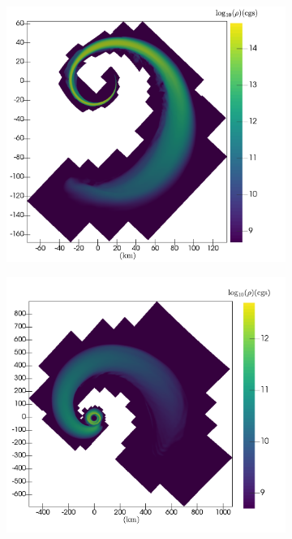 \begin{figure}
\begin{subfigure}[b]{0.475\textwidth}
		\centering
		\includegraphics[width=\linewidth]{images/rho_DD2_M12-merger-inertial}
		\label{fig:rho_M12_DD2_0ms}
	\end{subfigure}
	\begin{subfigure}[b]{0.475\textwidth}
		\centering
		\includegraphics[width=\linewidth]{images/rho_DD2_M12-5ms-inertial}
		\label{fig:rho_M12_DD2_5ms_}

\end{subfigure}
\end{figure}
